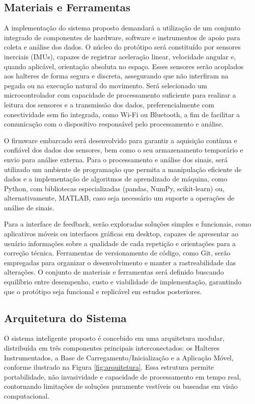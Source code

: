 \subsection{Materiais e Ferramentas}

A implementação do sistema proposto demandará a utilização de um conjunto integrado de componentes de hardware, software e instrumentos de apoio para coleta e análise dos dados. O núcleo do protótipo será constituído por sensores inerciais (IMUs), capazes de registrar aceleração linear, velocidade angular e, quando aplicável, orientação absoluta no espaço. Esses sensores serão acoplados aos halteres de forma segura e discreta, assegurando que não interfiram na pegada ou na execução natural do movimento. Será selecionado um microcontrolador com capacidade de processamento suficiente para realizar a leitura dos sensores e a transmissão dos dados, preferencialmente com conectividade sem fio integrada, como Wi-Fi ou Bluetooth, a fim de facilitar a comunicação com o dispositivo responsável pelo processamento e análise.

O firmware embarcado será desenvolvido para garantir a aquisição contínua e confiável dos dados dos sensores, bem como o seu armazenamento temporário e envio para análise externa. Para o processamento e análise dos sinais, será utilizado um ambiente de programação que permita a manipulação eficiente de dados e a implementação de algoritmos de aprendizado de máquina, como Python, com bibliotecas especializadas (pandas, NumPy, scikit-learn) ou, alternativamente, MATLAB, caso seja necessário um suporte a operações de análise de sinais.

Para a interface de feedback, serão exploradas soluções simples e funcionais, como aplicativos móveis ou interfaces gráficas em desktop, capazes de apresentar ao usuário informações sobre a qualidade de cada repetição e orientações para a correção técnica. Ferramentas de versionamento de código, como Git, serão empregadas para organizar o desenvolvimento e manter a rastreabilidade das alterações. O conjunto de materiais e ferramentas será definido buscando equilíbrio entre desempenho, custo e viabilidade de implementação, garantindo que o protótipo seja funcional e replicável em estudos posteriores.

\subsection{Arquitetura do Sistema}

O sistema inteligente proposto é concebido em uma arquitetura modular, distribuída em três componentes principais interconectados: os Halteres Instrumentados, a Base de Carregamento/Inicialização e a Aplicação Móvel, conforme ilustrado na Figura \ref{fig:arquitetura}. Essa estrutura permite portabilidade, não invasividade e capacidade de processamento em tempo real, contornando limitações de soluções puramente vestíveis ou baseadas em visão computacional.

